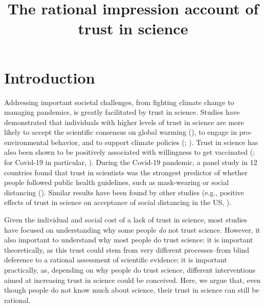 \documentclass[
  jou,
  floatsintext,
  longtable,
  nolmodern,
  notxfonts,
  notimes,
  colorlinks=true,linkcolor=blue,citecolor=blue,urlcolor=blue]{apa7}
\title{The rational impression account of trust in science}
\affiliation{
{Institut Jean Nicod, Département d'études cognitives, ENS, EHESS, PSL
University, CNRS, France}}
\begin{document}
\maketitle


\setcounter{secnumdepth}{-\maxdimen} %

\setlength\LTleft{0pt}


\section{Introduction}\label{introduction}

Addressing important societal challenges, from fighting climate change
to managing pandemics, is greatly facilitated by trust in science.
Studies have demonstrated that individuals with higher levels of trust
in science are more likely to accept the scientific consensus on global
warming (), to engage in pro-environmental behavior, and to support climate
policies (;
). Trust in science has also been shown to be positively
associated with willingness to get vaccinated
(; for
Covid-19 in particular,
). During the Covid-19 pandemic, a panel study in 12 countries
found that trust in scientists was the strongest predictor of whether
people followed public health guidelines, such as mask-wearing or social
distancing (). Similar results have been found by other studies (e.g., positive
effects of trust in science on acceptance of social distancing in the
US, ).

Given the individual and social cost of a lack of trust in science, most
studies have focused on understanding why some people \emph{do} not
trust science. However, it also important to understand why most people
do trust science: it is important theoretically, as this trust could
stem from very different processes--from blind deference to a rational
assessment of scientific evidence; it is important practically, as,
depending on why people do trust science, different interventions aimed
at increasing trust in science could be conceived. Here, we argue that,
even though people do not know much about science, their trust in
science can still be rational.
\end{document}
